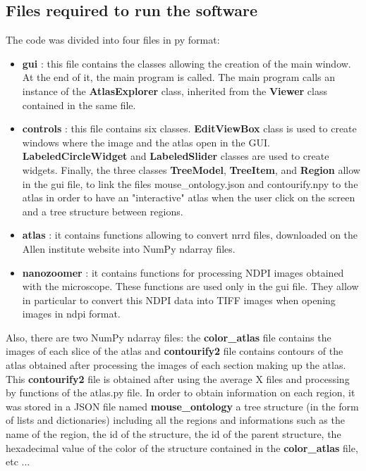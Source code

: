 \documentclass[a4paper,12pt]{report}
\begin{document}
\subsection{Files required to run the software}
The code was divided into four files in py format:
\vspace{0.4\baselineskip}
\begin{itemize}
    \item \textbf{gui} : this file contains the classes allowing the creation of the main window. At the end of it, the main program is called. The main program calls an instance of the \textbf{AtlasExplorer} class, inherited from the \textbf{Viewer} class contained in the same file.\vspace{0.4\baselineskip}
    \item \textbf{controls} : this file contains six classes. \textbf{EditViewBox} class is used to create windows where the image and the atlas open in the GUI. \textbf{LabeledCircleWidget} and \textbf{LabeledSlider} classes are used to create widgets. Finally, the three classes \textbf{TreeModel}, \textbf{TreeItem}, and \textbf{Region} allow in the gui file, to link the files mouse\_ontology.json and contourify.npy to the atlas in order to have an "interactive" atlas when the user click on the screen and a tree structure between regions. \vspace{0.4\baselineskip}
    \item \textbf{atlas} : it contains functions allowing to convert nrrd files, downloaded on the Allen institute website into NumPy ndarray files.\vspace{0.4\baselineskip}
    \item \textbf{nanozoomer} : it contains functions for processing NDPI images obtained with the microscope. These functions are used only in the gui file. They allow in particular to convert this NDPI data into TIFF images when opening images in ndpi format.\\
\end{itemize}

Also, there are two NumPy ndarray files: the \textbf{color\_atlas} file contains the images of each slice of the atlas and \textbf{contourify2} file contains contours of the atlas obtained after processing the images of each section making up the atlas. This \textbf{contourify2} file is obtained after using the average X files and processing by functions of the atlas.py file. In order to obtain information on each region, it was stored in a JSON file named \textbf{mouse\_ontology} a tree structure (in the form of lists and dictionaries) including all the regions and informations such as the name of the region, the id of the structure, the id of the parent structure, the hexadecimal value of the color of the structure contained in the \textbf{color\_atlas} file, etc ... \\
\end{document}
